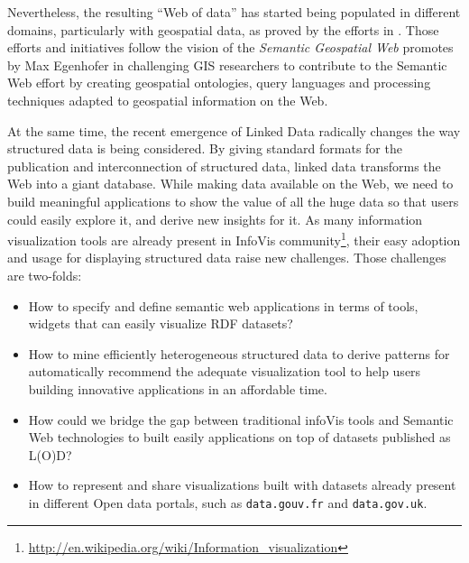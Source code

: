 Nevertheless, the resulting ``Web of data'' has started being populated in different domains, particularly with geospatial data, as proved by the efforts in \cite{goodwin08,linkedgeodata,deLeon2010,Salas2011}. Those efforts and initiatives follow the vision of the \textit{Semantic Geospatial Web} promotes by Max Egenhofer in \cite{egenhofer12} challenging GIS researchers to contribute to the Semantic Web effort by creating geospatial ontologies, query languages and processing techniques adapted to geospatial information on the Web. 

At the same time, the recent emergence of Linked Data radically changes the way structured data is being considered. By giving standard formats for the publication and interconnection of structured data, linked data transforms the Web into a giant database. While making data available on the Web, we need to build meaningful applications to show the value of all the huge data so that users could easily explore it, and derive new insights for it. As many information visualization tools are already present in InfoVis community\footnote{\url{http://en.wikipedia.org/wiki/Information_visualization}}, their easy adoption and usage for displaying structured data raise new challenges. Those challenges are two-folds:
\begin{itemize}
\item How to specify and define semantic web applications in terms of tools, widgets that can easily visualize RDF datasets?
\item How to mine efficiently heterogeneous structured data to derive patterns for automatically recommend the adequate visualization tool to help users building innovative applications in an affordable time.
\item How could we bridge the gap between traditional infoVis tools and Semantic Web technologies to built easily applications on top of datasets published as L(O)D?
\item How to represent and share visualizations built with datasets already present in different Open data portals, such as \texttt{data.gouv.fr} and \texttt{data.gov.uk}.  
\end{itemize}

  

